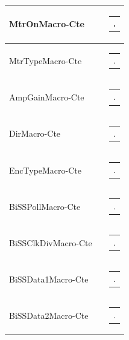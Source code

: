 \documentclass[openany]{article}
\begin{document}
\begin{longtable}{| m{4.5cm} m{2.5cm}  m{8.5cm} |}
        MtrOnMacro-Cte &  & \begin{tabular}{@{}m{6cm}@{}}
                .
            \end{tabular} \hypertarget{pv:mtr-type-macro-cte}{}\\ \hline
        MtrTypeMacro-Cte &  & \begin{tabular}{@{}m{6cm}@{}}
                .
            \end{tabular} \hypertarget{pv:amp-gain-macro-cte}{}\\ \hline
        AmpGainMacro-Cte &  & \begin{tabular}{@{}m{6cm}@{}}
                .
            \end{tabular} \hypertarget{pv:dir-macro-cte}{}\\ \hline
        DirMacro-Cte &  & \begin{tabular}{@{}m{6cm}@{}}
                .
            \end{tabular} \hypertarget{pv:enc-type-macro-cte}{}\\ \hline
        EncTypeMacro-Cte &  & \begin{tabular}{@{}m{6cm}@{}}
                .
            \end{tabular} \hypertarget{pv:biss-poll-macro-cte}{}\\ \hline
        BiSSPollMacro-Cte &  & \begin{tabular}{@{}m{6cm}@{}}
                .
            \end{tabular} \hypertarget{pv:biss-clk-div-macro-cte}{}\\ \hline
        BiSSClkDivMacro-Cte &  & \begin{tabular}{@{}m{6cm}@{}}
                .
            \end{tabular} \hypertarget{pv:biss-data-1--macro-cte}{}\\ \hline
        BiSSData1Macro-Cte &  & \begin{tabular}{@{}m{6cm}@{}}
                .
            \end{tabular} \hypertarget{pv:biss-data-2-macro-cte}{}\\ \hline
        BiSSData2Macro-Cte &  & \begin{tabular}{@{}m{6cm}@{}}
                .
            \end{tabular} \hypertarget{pv:biss-zero-pad-macro-cte}{}\\ \hline

\end{longtable}
\end{document}
